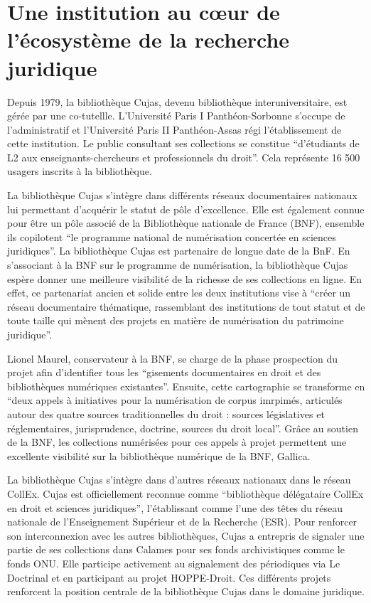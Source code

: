 \section[Une institution juridique]{Une institution au cœur de l’écosystème de la recherche juridique}

Depuis 1979, la bibliothèque Cujas, devenu bibliothèque interuniversitaire, est gérée par une co-tutellle. L'Université Paris I Panthéon-Sorbonne s'occupe de l'administratif et l'Université Paris II Panthéon-Assas régi l'établissement de cette institution. Le public consultant ses collections se constitue \enquote{d'étudiants de L2 aux enseignants-chercheurs et professionnels du droit}. Cela représente 16 500 usagers inscrits à la bibliothèque. 

La bibliothèque Cujas s'intègre dans différents réseaux documentaires nationaux lui permettant d'acquérir le statut de pôle d'excellence. Elle est également connue pour être un pôle associé de la Bibliothèque nationale de France (BNF), ensemble ils copilotent \enquote{le programme national de numérisation concertée en sciences juridiques}. La bibliothèque Cujas est partenaire de longue date de la BnF. En s'associant à la BNF sur le programme de numérisation, la bibliothèque Cujas espère donner une meilleure visibilité de la richesse de ses collections en ligne. En effet, ce partenariat ancien et solide entre les deux institutions vise à \enquote{créer un réseau documentaire thématique, rassemblant des institutions de tout statut et de toute taille qui mènent des projets en matière de numérisation du patrimoine juridique}. 

Lionel Maurel, conservateur à la BNF, se charge de la phase prospection du projet afin d'identifier tous les \enquote{gisements documentaires en droit et des bibliothèques numériques existantes}. Ensuite, cette cartographie se transforme en \enquote{deux appels à initiatives pour la numérisation de corpus imrpimés, articulés autour des quatre sources traditionnelles du droit : sources législatives et réglementaires, jurisprudence, doctrine, sources du droit local}. Grâce au soutien de la BNF, les collections numérisées pour ces appels à projet permettent une excellente visibilité sur la bibliothèque numérique de la BNF, Gallica. 

La bibliothèque Cujas s'intègre dans d'autres réseaux nationaux dans le réseau CollEx. Cujas est officiellement reconnue comme \enquote{bibliothèque délégataire CollEx en droit et sciences juridiques}, l'établissant comme l'une des têtes du réseau nationale de l'Enseignement Supérieur et de la Recherche (ESR). Pour renforcer son interconnexion avec les autres bibliothèques, Cujas a entrepris de signaler une partie de ses collections dans Calames pour ses fonds archivistiques comme le fonds ONU. Elle participe activement au signalement des périodiques via Le Doctrinal et en participant au projet HOPPE-Droit. Ces différents projets renforcent la position centrale de la bibliothèque Cujas dans le domaine juridique.

